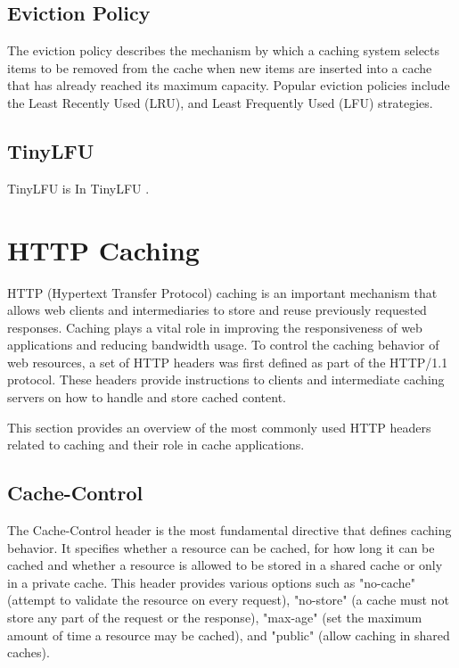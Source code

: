 \subsection{Eviction Policy}
The eviction policy describes the mechanism by which a caching system selects items to be removed from the cache when new items are inserted into a cache that has already reached its maximum capacity. Popular eviction policies include the Least Recently Used (LRU), and Least Frequently Used (LFU) strategies.

\subsection{TinyLFU}
\label{tiny_lfu}
TinyLFU is 
In TinyLFU .

\section{HTTP Caching}
\label{http_cache_policy}

HTTP (Hypertext Transfer Protocol) caching is an important mechanism that allows web clients and intermediaries to store and reuse previously requested responses. Caching plays a vital role in improving the responsiveness of web applications and reducing bandwidth usage. To control the caching behavior of web resources, a set of HTTP headers was first defined as part of the HTTP/1.1 protocol\cite{rfc2616}. These headers provide instructions to clients and intermediate caching servers on how to handle and store cached content.

This section provides an overview of the most commonly used HTTP headers related to caching and their role in cache applications.

\subsection{Cache-Control} The Cache-Control header is the most fundamental directive that defines caching behavior. It specifies whether a resource can be cached, for how long it can be cached and whether a resource is allowed to be stored in a shared cache or only in a private cache. This header provides various options such as "no-cache" (attempt to validate the resource on every request), "no-store" (a cache must not store any part of the request or the response), "max-age" (set the maximum amount of time a resource may be cached), and "public" (allow caching in shared caches)\cite{rfc9111}.

